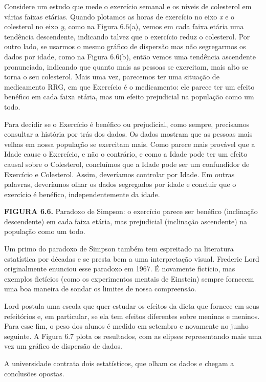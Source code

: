 \documentclass[11pt,a5paper,twoside]{book}
\begin{document}
Considere um estudo que mede o exercício semanal e os níveis de colesterol em várias faixas etárias. Quando plotamos as horas de exercício no eixo \textit{x} e o colesterol no eixo \textit{y}, como na Figura 6.6(a), vemos em cada faixa etária uma tendência descendente, indicando talvez que o exercício reduz o colesterol. Por outro lado, se usarmos o mesmo gráfico de dispersão mas não segregarmos os dados por idade, como na Figura 6.6(b), então vemos uma tendência ascendente pronunciada, indicando que quanto mais as pessoas se exercitam, mais alto se torna o seu colesterol. Mais uma vez, parecemos ter uma situação de medicamento RRG, em que Exercício é o medicamento: ele parece ter um efeito benéfico em cada faixa etária, mas um efeito prejudicial na população como um todo.

Para decidir se o Exercício é benéfico ou prejudicial, como sempre, precisamos consultar a história por trás dos dados. Os dados mostram que as pessoas mais velhas em nossa população se exercitam mais. Como parece mais provável que a Idade cause o Exercício, e não o contrário, e como a Idade pode ter um efeito causal sobre o Colesterol, concluímos que a Idade pode ser um confundidor de Exercício e Colesterol. Assim, deveríamos controlar por Idade. Em outras palavras, deveríamos olhar os dados segregados por idade e concluir que o exercício é benéfico, independentemente da idade.

\textbf{FIGURA 6.6.} Paradoxo de Simpson: o exercício parece ser benéfico (inclinação descendente) em cada faixa etária, mas prejudicial (inclinação ascendente) na população como um todo.

Um primo do paradoxo de Simpson também tem espreitado na literatura estatística por décadas e se presta bem a uma interpretação visual. Frederic Lord originalmente enunciou esse paradoxo em 1967. É novamente fictício, mas exemplos fictícios (como os experimentos mentais de Einstein) sempre fornecem uma boa maneira de sondar os limites de nossa compreensão.

Lord postula uma escola que quer estudar os efeitos da dieta que fornece em seus refeitórios e, em particular, se ela tem efeitos diferentes sobre meninas e meninos. Para esse fim, o peso dos alunos é medido em setembro e novamente no junho seguinte. A Figura 6.7 plota os resultados, com as elipses representando mais uma vez um gráfico de dispersão de dados.

A universidade contrata dois estatísticos, que olham os dados e chegam a conclusões opostas.
\end{document}
